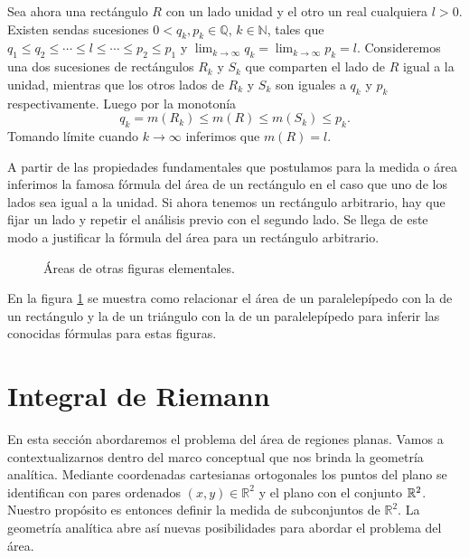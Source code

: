 Sea ahora una rectángulo $R$ con un lado unidad y el otro un real cualquiera $l>0$. Existen sendas sucesiones $0<q_k,p_k\in\mathbb{Q}$, $k\in\mathbb{N}$, tales que $q_1\leq q_2\leq\cdots \leq l \leq \cdots\leq p_2\leq p_1$ y $\lim_{k\to\infty}q_k =\lim_{k\to\infty} p_k=l$. Consideremos una dos sucesiones de rectángulos $R_k$ y $S_k$ que comparten el lado de $R$ igual a la unidad, mientras que los otros lados de $R_k$ y $S_k$ son iguales a $q_k$ y $p_k$ respectivamente. Luego por la monotonía
\[
 q_k=m(R_k)\leq m(R) \leq m(S_k)\leq p_k.
\]
Tomando límite cuando $k\to\infty$ inferimos que $m(R)=l$. 




A partir de las propiedades fundamentales que postulamos para la medida o área inferimos la famosa fórmula del área de un rectángulo en el caso que uno de los lados sea igual a la unidad. Si ahora tenemos un rectángulo arbitrario, hay que fijar un lado y repetir el análisis previo con el segundo lado. Se llega de este modo a justificar la fórmula del área para un  rectángulo arbitrario. 


\begin{figure}[h]
 \begin{center}
  
 \end{center}
 \caption{Áreas de otras figuras elementales.}\label{fig:paral-trig}
\end{figure}

En la figura \ref{fig:paral-trig} se muestra como relacionar el área de un paralelepípedo con la de un rectángulo y la de un triángulo con la de un paralelepípedo para inferir las conocidas fórmulas para estas figuras.



\section{Integral de Riemann}

En esta sección abordaremos el problema del área de regiones planas. Vamos a contextualizarnos dentro del marco conceptual que nos brinda la geometría analítica. Mediante coordenadas cartesianas ortogonales los puntos del plano se identifican con pares ordenados $(x,y)\in\mathbb{R}^2$ y el plano con el conjunto $\mathbb{R}^2$.  Nuestro propósito es entonces definir la medida de subconjuntos de $\mathbb{R}^2$. La geometría analítica abre así nuevas posibilidades para abordar el problema del área. 

